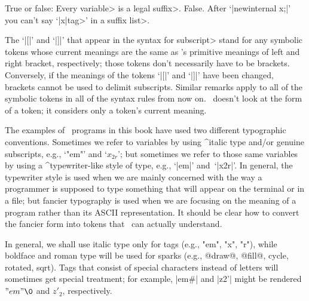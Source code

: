 {\dangerexercise True or false: Every \<variable> is a legal \<suffix>.
\answer False. After `|newinternal x;|' you can't say
`|x|\<tag>' in a \<suffix list>.

\ddanger The `|[|' and `|]|' that appear in the syntax for \<subscript>
stand for any symbolic tokens whose current meanings are the same as
\MF's primitive meanings of left and right bracket, respectively;
those tokens don't necessarily have to be brackets. Conversely, if the
meanings of the tokens `|[|' and `|]|' have been changed, brackets cannot
be used to delimit subscripts. Similar remarks apply to all of the
symbolic tokens in all of the syntax rules from now on. \MF\ doesn't look
at the form of a token; it considers only a token's current meaning.

The examples of \MF\ programs in this book have used two different
typographic conventions. Sometimes we refer to variables by using
^{italic type} and/or genuine subscripts, e.g., `"em"' and `$x_{2r}$';
but sometimes we refer to those same variables by using a ^{typewriter}-like
style of type, e.g., `|em|' and~`|x2r|'. In general, the typewriter style
is used when we are mainly concerned with the way a programmer is supposed
to type something that will appear on the terminal or in a file; but fancier
typography is used when we are focusing on the meaning of a program rather
than its ASCII representation. It should be clear how to convert the fancier
form into tokens that \MF\ can actually understand.

\danger In general, we shall use italic type only for tags (e.g., "em",
"x", "r"), while boldface and roman type will be used for sparks
(e.g., @draw@, @fill@, cycle, rotated, sqrt). Tags that consist of special
characters instead of letters will sometimes get special treatment;
for example, |em#| and |z2'| might be rendered $"em"\0$ and $z'_2$,
respectively.

}
